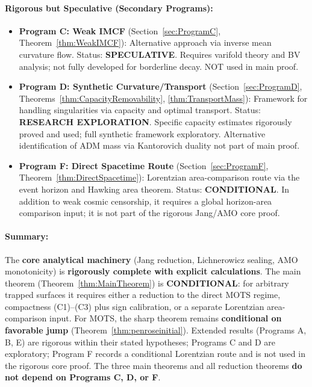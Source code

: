 \paragraph{Rigorous but Speculative (Secondary Programs):}
\begin{itemize}
    \item \textbf{Program C: Weak IMCF} (Section~\ref{sec:ProgramC}, Theorem~\ref{thm:WeakIMCF}): Alternative approach via inverse mean curvature flow. Status: \textbf{SPECULATIVE}. Requires varifold theory and BV analysis; not fully developed for borderline decay. NOT used in main proof.
    
    \item \textbf{Program D: Synthetic Curvature/Transport} (Section~\ref{sec:ProgramD}, Theorems~\ref{thm:CapacityRemovability}, \ref{thm:TransportMass}): Framework for handling singularities via capacity and optimal transport. Status: \textbf{RESEARCH EXPLORATION}. Specific capacity estimates rigorously proved and used; full synthetic framework exploratory. Alternative identification of ADM mass via Kantorovich duality not part of main proof.
    
    \item \textbf{Program F: Direct Spacetime Route} (Section~\ref{sec:ProgramF}, Theorem~\ref{thm:DirectSpacetime}): Lorentzian area-comparison route via the event horizon and Hawking area theorem. Status: \textbf{CONDITIONAL}. In addition to weak cosmic censorship, it requires a global horizon-area comparison input; it is not part of the rigorous Jang/AMO core proof.
\end{itemize}

\paragraph{Summary:}
The \textbf{core analytical machinery} (Jang reduction, Lichnerowicz sealing, AMO monotonicity) is \textbf{rigorously complete with explicit calculations}. The main theorem (Theorem~\ref{thm:MainTheorem}) is \textbf{CONDITIONAL}: for arbitrary trapped surfaces it requires either a reduction to the direct MOTS regime, compactness (C1)--(C3) plus sign calibration, or a separate Lorentzian area-comparison input. For MOTS, the sharp theorem remains \textbf{conditional on favorable jump} (Theorem~\ref{thm:penroseinitial}). Extended results (Programs A, B, E) are rigorous within their stated hypotheses; Programs C and D are exploratory; Program F records a conditional Lorentzian route and is not used in the rigorous core proof. The three main theorems and all reduction theorems \textbf{do not depend on Programs C, D, or F}.

